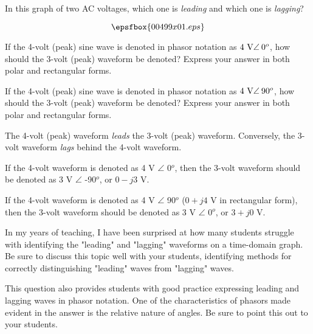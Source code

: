 

In this graph of two AC voltages, which one is {\it leading} and which one is {\it lagging}?

$$\epsfbox{00499x01.eps}$$

If the 4-volt (peak) sine wave is denoted in phasor notation as $4 \hbox{ V} \angle \> 0^o$, how should the 3-volt (peak) waveform be denoted?  Express your answer in both polar and rectangular forms.

\vskip 5pt

If the 4-volt (peak) sine wave is denoted in phasor notation as $4 \hbox{ V} \angle \> 90^o$, how should the 3-volt (peak) waveform be denoted?  Express your answer in both polar and rectangular forms.







The 4-volt (peak) waveform {\it leads} the 3-volt (peak) waveform.  Conversely, the 3-volt waveform {\it lags} behind the 4-volt waveform.

\vskip 5pt

If the 4-volt waveform is denoted as 4 V $\angle$ 0$^o$, then the 3-volt waveform should be denoted as 3 V $\angle$ -90$^o$, or $0 - j3$ V.

\vskip 5pt

If the 4-volt waveform is denoted as 4 V $\angle$ 90$^o$ ($0 + j4$ V in rectangular form), then the 3-volt waveform should be denoted as 3 V $\angle$ 0$^o$, or $3 + j0$ V.







In my years of teaching, I have been surprised at how many students struggle with identifying the "leading" and "lagging" waveforms on a time-domain graph.  Be sure to discuss this topic well with your students, identifying methods for correctly distinguishing "leading" waves from "lagging" waves.

This question also provides students with good practice expressing leading and lagging waves in phasor notation.  One of the characteristics of phasors made evident in the answer is the relative nature of angles.  Be sure to point this out to your students.




